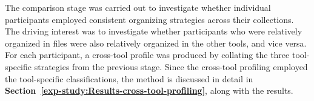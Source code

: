 The comparison stage was carried out to investigate whether individual participants employed consistent organizing strategies across their collections. The driving interest was to investigate whether participants who were relatively organized in files were also relatively organized in the other tools, and vice versa.  For each participant, a cross-tool profile was produced by collating the three tool-specific strategies from the previous stage.  Since the cross-tool profiling employed the tool-specific classifications, the method is discussed in detail in \textbf{Section~\ref{exp-study:Results-cross-tool-profiling}}, along with the results.

